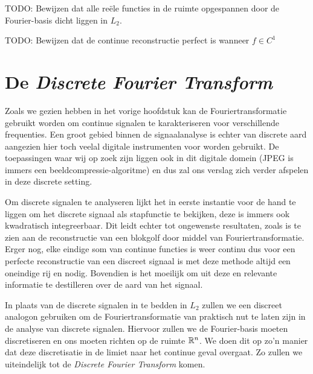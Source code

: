 TODO: Bewijzen dat alle re\"ele functies in de ruimte opgespannen door de Fourier-basis dicht liggen in $L_2$.

TODO: Bewijzen dat de continue reconstructie perfect is wanneer $f \in C^1$


\section{De \emph{Discrete Fourier Transform}}
Zoals we gezien hebben in het vorige hoofdstuk kan de Fouriertransformatie gebruikt worden om continue signalen te karakteriseren voor verschillende frequenties. Een groot gebied binnen de signaalanalyse is echter van discrete aard aangezien hier toch veelal digitale instrumenten voor worden gebruikt. De toepassingen waar wij op zoek zijn liggen ook in dit digitale domein (JPEG is immers een beeldcompressie-algoritme) en dus zal ons verslag zich verder afspelen in deze discrete setting.

Om discrete signalen te analyseren lijkt het in eerste instantie voor de hand te liggen om het discrete signaal als stapfunctie te bekijken, deze is immers ook kwadratisch integreerbaar. Dit leidt echter tot ongewenste resultaten, zoals is te zien aan de reconstructie van een blokgolf door middel van Fouriertransformatie. Erger nog, elke eindige som van continue functies is weer continu dus voor een perfecte reconstructie van een discreet signaal is met deze methode altijd een oneindige rij \coefficient en nodig. Bovendien is het moeilijk om uit deze \coefficient en relevante informatie te destilleren over de aard van het signaal.

In plaats van de discrete signalen in te bedden in $L_2$ zullen we een discreet analogon gebruiken om de Fouriertransformatie van praktisch nut te laten zijn in de analyse van discrete signalen.
Hiervoor zullen we de Fourier-basis moeten discretiseren en ons moeten richten op de ruimte $\mathbb{R}^n$.
We doen dit op zo'n manier dat deze discretisatie in de limiet naar het continue geval overgaat.
Zo zullen we uiteindelijk tot de \emph{Discrete Fourier Transform} komen.

